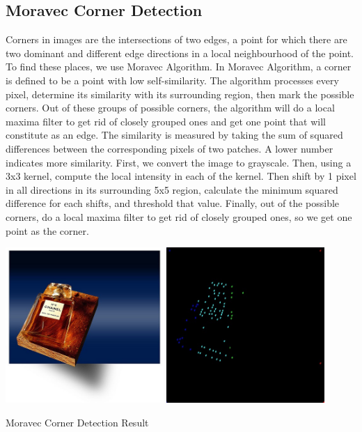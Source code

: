 \documentclass{article}
\begin{document}
        
    \subsection{Moravec Corner Detection}
        Corners in images are the intersections of two edges, a point for which there are two dominant and different edge directions in a local neighbourhood of the point. To find these places, we use Moravec Algorithm. In Moravec Algorithm,  a corner is defined to be a point with low self-similarity. The algorithm processes every pixel, determine its similarity with its surrounding region, then mark the possible corners. Out of these groups of possible corners, the algorithm will do a local maxima filter to get rid of closely grouped ones and get one point that will constitute as an edge. The similarity is measured by taking the sum of squared differences between the corresponding pixels of two patches. A lower number indicates more similarity. First, we convert the image to grayscale. Then, using a 3x3 kernel, compute the local intensity in each of the kernel. Then shift by 1 pixel in all directions in its surrounding 5x5 region, calculate the minimum squared difference for each shifts, and threshold that value. Finally, out of the possible corners, do a local maxima filter to get rid of closely grouped ones, so we get one point as the corner.
        \begin{center}
        \includegraphics[width=0.45\textwidth]{source/images/moravec.jpg}
        \includegraphics[width=0.45\textwidth]{source/images/moravec-after.jpg}
        
        \caption{Moravec Corner Detection Result}
        \end{center}
        
\end{document}
